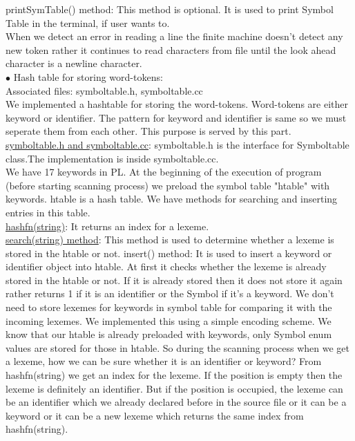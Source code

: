 \documentclass[paper=letter, fontsize=12pt]{scrartcl} %
\begin{document}
printSymTable() method: This method is optional. It is used to print Symbol Table in the terminal, if user wants to.\\

When we detect an error in reading a line the finite machine doesn't detect any new token rather it continues to read characters from file until the look ahead character is a newline character.\\

$\bullet$ Hash table for storing word-tokens: \\

Associated files: symboltable.h, symboltable.cc\\

We implemented a hashtable for storing the word-tokens. Word-tokens are either keyword or identifier. The pattern for keyword and identifier is same so we must seperate them from each other. This purpose is served by this part.\\
\underline {symboltable.h and symboltable.cc}: symboltable.h  is the interface for Symboltable class.The implementation is inside symboltable.cc.\\
We have 17 keywords in PL. At the beginning of the execution of program (before starting scanning process) we preload the symbol table "htable" with keywords. htable is a hash table.
We have methods for searching and inserting entries in this table.\\
\underline {hashfn(string)}: It returns an index for a lexeme.\\
\underline {search(string) method}: This method is used to  determine whether a lexeme is stored in the htable or not. 
insert() method: It is used to insert a keyword or identifier object into htable. At first it checks whether the lexeme is already stored in the htable or not. If it is already stored then it does not store it again rather returns 1 if it is an identifier or the Symbol if it's a keyword. We don't need to store lexemes for keywords in symbol table for comparing it with the incoming lexemes. We implemented this using a simple encoding scheme. We know that our htable is already preloaded with keywords, only Symbol enum values are stored for those in htable. So during the scanning process when we get a lexeme, how we can be sure whether it is an identifier or keyword? From hashfn(string) we get an index for the lexeme. If the position is empty then the lexeme is definitely an identifier. But if the position is occupied, the lexeme can be an identifier which we already declared before in the source file or it can be a keyword or it can be a new lexeme which returns the same index from hashfn(string).
\end{document}
